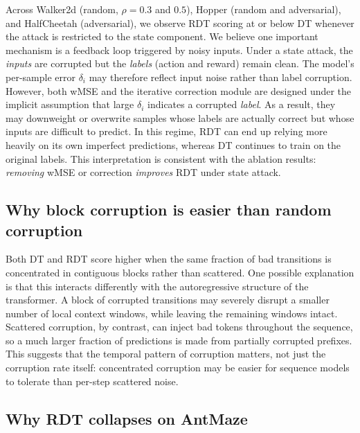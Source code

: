 \documentclass[10pt,twocolumn,letterpaper]{article}
\begin{document}
Across Walker2d (random, $\rho=0.3$ and $0.5$), Hopper (random and
adversarial), and HalfCheetah (adversarial), we observe RDT scoring at or
below DT whenever the attack is restricted to the state component. We
believe one important mechanism is a feedback loop triggered by noisy
inputs. Under a state attack, the \emph{inputs} are corrupted but the
\emph{labels} (action and reward) remain clean. The model's per-sample
error $\delta_i$ may therefore reflect input noise rather than label
corruption. However, both wMSE and the iterative correction module are
designed under the implicit assumption that large $\delta_i$ indicates a
corrupted \emph{label}. As a result, they may downweight or overwrite
samples whose labels are actually correct but whose inputs are difficult
to predict. In this regime, RDT can end up relying more heavily on its
own imperfect predictions, whereas DT continues to train on the original
labels. This interpretation is consistent with the ablation results:
\emph{removing} wMSE or correction \emph{improves} RDT under state attack.

\subsection{Why block corruption is easier than random corruption}

Both DT and RDT score higher when the same fraction of bad transitions is
concentrated in contiguous blocks rather than scattered. One possible
explanation is that this interacts differently with the autoregressive
structure of the transformer. A block of corrupted transitions may
severely disrupt a smaller number of local context windows, while leaving
the remaining windows intact. Scattered corruption, by contrast, can
inject bad tokens throughout the sequence, so a much larger fraction of
predictions is made from partially corrupted prefixes. This suggests that
the temporal pattern of corruption matters, not just the corruption rate
itself: concentrated corruption may be easier for sequence models to
tolerate than per-step scattered noise.

\subsection{Why RDT collapses on AntMaze}
\end{document}
